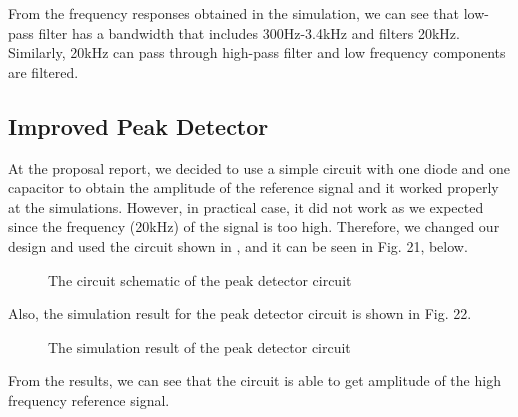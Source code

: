 \documentclass[conference]{IEEEtran}
\begin{document}
From the frequency responses obtained in the simulation, we can see that low-pass filter has a bandwidth that includes 300Hz-3.4kHz and filters 20kHz. 
Similarly, 20kHz can pass through high-pass filter and low frequency components are filtered. 

\subsection{Improved Peak Detector}
At the proposal report, we decided to use a simple circuit with one diode and one capacitor to obtain the amplitude 
of the reference signal and it worked properly at the simulations. However, in practical case, it did not work as we expected 
since the frequency (20kHz) of the signal is too high. Therefore, we changed our design and used the circuit shown in \cite{peak}, and it can be seen in Fig. 21, below.
\begin{figure}[H]
   \centerline{}
    \caption{The circuit schematic of the peak detector circuit}
\end{figure}
\par Also, the simulation result for the peak detector circuit is shown in Fig. 22.
\begin{figure}[H]
   \centerline{}
    \caption{The simulation result of the peak detector circuit}
\end{figure}

From the results, we can see that the circuit is able to get amplitude of the high frequency reference signal.
\end{document}
